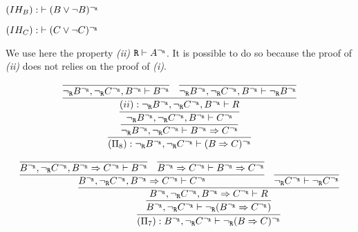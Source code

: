 \begin{enumerate}[(i)]
\begin{itemize}
            $(IH_B) : \; \vdash (B \vee \neg B)^{\neg_{\texttt{R}}}$
            
            $(IH_C) : \; \vdash (C \vee \neg C)^{\neg_{\texttt{R}}}$
            
            We use here the property \textit{(ii)} $\texttt{R} \vdash A^{\neg_{\texttt{R}}}$. It is possible to do so because the proof of \textit{(ii)} does not relies on the proof of \textit{(i)}.
            
            $$
            \infer{
                 (\Pi_8): \ngr B^\ngr, \ngr C^\ngr \vdash (B \Rightarrow C)^\ngr
            }{
                 \infer{
                     \ngr B^\ngr, \ngr C^\ngr \vdash B^\ngr \Rightarrow C^\ngr
                }{
                    \infer{
                        \ngr B^\ngr, \ngr C^\ngr, B^\ngr \vdash C^\ngr
                    }{
                        \infer{
                            (ii): \ngr B^\ngr, \ngr C^\ngr, B^\ngr \vdash R
                        }{
                            \infer{
                                \ngr B^\ngr, \ngr C^\ngr, B^\ngr \vdash B^\ngr
                            }{
                            }
                            &
                            \infer{
                                \ngr B^\ngr, \ngr C^\ngr, B^\ngr \vdash \ngr B^\ngr
                            }{
                            }
                        }
                    }
                }
            }
            $$
            
            $$
            \infer{
                 (\Pi_7): B^\ngr, \ngr C^\ngr \vdash \ngr (B \Rightarrow C)^\ngr
                }{
                    \infer{
                        B^\ngr, \ngr C^\ngr \vdash \ngr (B^\ngr \Rightarrow C^\ngr)
                    }{
                        \infer{
                            B^\ngr, \ngr C^\ngr, B^\ngr \Rightarrow C^\ngr \vdash R
                        }{
                            \infer{
                                B^\ngr, \ngr C^\ngr, B^\ngr \Rightarrow C^\ngr \vdash C^\ngr
                            }{
                                \infer{
                                    B^\ngr, \ngr C^\ngr, B^\ngr \Rightarrow C^\ngr \vdash B^\ngr
                                }{
                                }
                                &
                                \infer{
                                    B^\ngr \Rightarrow C^\ngr \vdash  B^\ngr \Rightarrow C^\ngr
                                }{
                                }
                            }
                            &
                            \infer{
                                \ngr C^\ngr \vdash \ngr C^\ngr
                            }{
                            }
                        }
                    }
                }
            $$
            

\end{itemize}
\end{enumerate}

